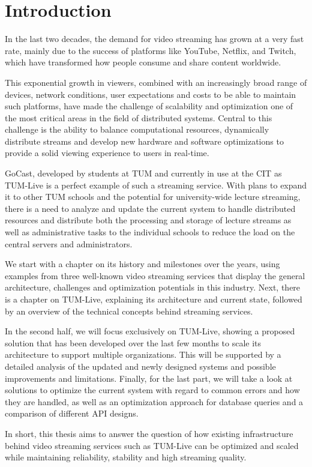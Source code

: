 
\chapter{Introduction}\label{chapter:introduction}

In the last two decades, the demand for video streaming has grown at a very fast rate, mainly due to the success of platforms like YouTube, Netflix, and Twitch, which have transformed how people consume and share content worldwide.

This exponential growth in viewers, combined with an increasingly broad range of devices, network conditions, user expectations and costs to be able to maintain such platforms, have made the challenge of scalability and optimization one of the most critical areas in the field of distributed systems. Central to this challenge is the ability to balance computational resources, dynamically distribute streams and develop new hardware and software optimizations to provide a solid viewing experience to users in real-time.

GoCast, developed by students at \ac{TUM} and currently in use at the \ac{CIT} as TUM-Live is a perfect example of such a streaming service. With plans to expand it to other \ac{TUM} schools and the potential for university-wide lecture streaming, there is a need to analyze and update the current system to handle distributed resources and distribute both the processing and storage of lecture streams as well as administrative tasks to the individual schools to reduce the load on the central servers and administrators.

We start with a chapter on its history and milestones over the years, using examples from three well-known video streaming services that display the general architecture, challenges and optimization potentials in this industry. Next, there is a chapter on TUM-Live, explaining its architecture and current state, followed by an overview of the technical concepts behind streaming services.  

In the second half, we will focus exclusively on TUM-Live, showing a proposed solution that has been developed over the last few months to scale its architecture to support multiple organizations. This will be supported by a detailed analysis of the updated and newly designed systems and possible improvements and limitations. Finally, for the last part, we will take a look at solutions to optimize the current system with regard to common errors and how they are handled, as well as an optimization approach for database queries and a comparison of different \ac{API} designs.    

In short, this thesis aims to answer the question of how existing infrastructure behind video streaming services such as TUM-Live can be optimized and scaled while maintaining reliability, stability and high streaming quality.